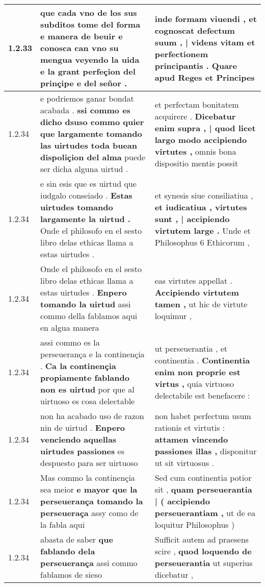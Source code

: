 \begin{tabular}{|p{1cm}|p{6.5cm}|p{6.5cm}|}
1.2.33 & que cada vno de los sus subditos tome del forma e manera de beuir \textbf{ e conosca can vno su mengua veyendo la uida } e la grant perfeçion del prinçipe e del señor . & inde formam viuendi , \textbf{ et cognoscat defectum suum , | videns vitam et perfectionem principantis . } Quare apud Reges et Principes \\\hline
1.2.34 & e podriemos ganar bondat acabada . \textbf{ ssi commo es dicho dsuso commo quier que largamente tomando las uirtudes toda buean dispoliçion del alma } puede ser dicha alguna uirtud . & et perfectam bonitatem acquirere . \textbf{ Dicebatur enim supra , | quod licet largo modo accipiendo virtutes , } omnis bona dispositio mentis possit \\\hline
1.2.34 & e sin esis que es uirtud que iudgalo conseiado . \textbf{ Estas uirtudes tomando largamente la uirtud . } Onde el philosofo en el sesto libro delas ethicas llama a estas uirtudes . & et synesis siue consiliatiua , \textbf{ et iudicatiua , virtutes sunt , | accipiendo virtutem large . } Unde et Philosophus 6 Ethicorum , \\\hline
1.2.34 & Onde el philosofo en el sesto libro delas ethicas llama a estas uirtudes . \textbf{ Enpero tomando la uirtud } assi commo della fablamos aqui en algua manera & eas virtutes appellat . \textbf{ Accipiendo virtutem tamen , } ut hic de virtute loquimur , \\\hline
1.2.34 & assi commo es la perseuerança e la continençia . \textbf{ Ca la continençia propiamente fablando non es uirtud } por que al uirtuoso es cosa delectable & ut perseuerantia , et continentia . \textbf{ Continentia enim non proprie est virtus , } quia virtuoso delectabile est benefacere : \\\hline
1.2.34 & non ha acabado uso de razon nin de uirtud . \textbf{ Enpero venciendo aquellas uirtudes passiones } es despuesto para ser uirtuoso & non habet perfectum usum rationis et virtutis : \textbf{ attamen vincendo passiones illas , } disponitur ut sit virtuosus . \\\hline
1.2.34 & Mas commo la continençia sea meior \textbf{ e mayor que la perseuerança tomando la perseueraça } assy como de la fabla aqui & Sed cum continentia potior sit , \textbf{ quam perseuerantia | ( accipiendo perseuerantiam , } ut de ea loquitur Philosophus ) \\\hline
1.2.34 & abasta de saber \textbf{ que fablando dela perseuerança } assi commo fablamos de sieso & Sufficit autem ad praesens scire , \textbf{ quod loquendo de perseuerantia } ut superius dicebatur , \\\hline

\end{tabular}
